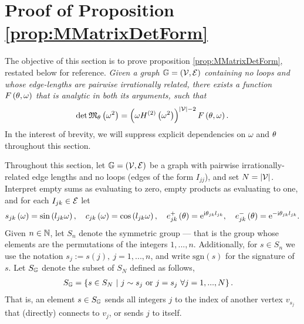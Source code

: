 \section{Proof of Proposition \ref{prop:MMatrixDetForm}} \label{sec:ProofOfProp}
The objective of this section is to prove proposition \ref{prop:MMatrixDetForm}, restated below for reference. \newline
\textit{Given a graph $\mathbb{G} = \left( \mathcal{V}, \mathcal{E} \right)$ containing no loops and whose edge-lengths are pairwise irrationally related, there exists a function $F\left( \theta,\omega \right)$ that is analytic in both its arguments, such that
\begin{align*}
	\det\mathfrak{M}_\theta\left( \omega^2 \right) = \left(  \omega H^{(2)}\left( \omega^2 \right)  \right)^{\left\lvert \mathcal{V} \right\rvert-2} F\left( \theta,\omega \right).
\end{align*}
} \newline
In the interest of brevity, we will suppress explicit dependencies on $\omega$ and $\theta$ throughout this section.

Throughout this section, let $\mathbb{G}=\left( \mathcal{V}, \mathcal{E} \right)$ be a graph with pairwise irrationally-related edge lengths and no loops (edges of the form $I_{jj}$), and set $N=\left\lvert \mathcal{V} \right\rvert$.
Interpret empty sums as evaluating to zero, empty products as evaluating to one, and for each $I_{jk}\in\mathcal{E}$ let
\begin{align*}
	s_{jk}\left( \omega \right) = \sin\left( l_{jk}\omega \right), \quad
	c_{jk}\left( \omega \right) = \cos\left( l_{jk}\omega \right), \quad
	e_{jk}^+\left( \theta \right) = \mathrm{e}^{\mathrm{i}\theta_{jk}l_{jk}}, \quad
	e_{jk}^-\left( \theta \right) = \mathrm{e}^{-\mathrm{i}\theta_{jk}l_{jk}}.
\end{align*}
Given $n\in\mathbb{N}$, let $S_n$ denote the symmetric group --- that is the group whose elements are the permutations of the integers $1, ..., n$.
Additionally, for $s\in S_n$ we use the notation $s_j := s(j), \ j=1,...,n$, and write $\mathrm{sgn}(s)$ for the signature of $s$.
Let $S_{\mathbb{G}}$ denote the subset of $S_N$ defined as follows,
\begin{align*}
	S_{\mathbb{G}} &= \left\{  s\in S_N \ \middle\vert \  j\sim s_j \text{ or } j=s_j \ \forall j=1,...,N \right\}.
\end{align*}
That is, an element $s\in S_{\mathbb{G}}$ sends all integers $j$ to the index of another vertex $v_{s_j}$ that (directly) connects to $v_j$, or sends $j$ to itself.

